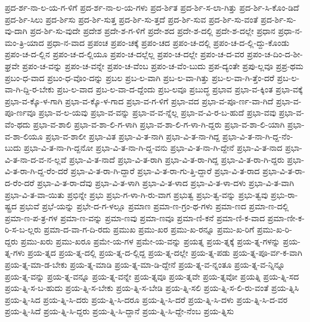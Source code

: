{ಪ್ರದ-ರ್ಶ-ನಾ-ಲ-ಯ-ಗ-ಳಿಗೆ
ಪ್ರದ-ರ್ಶ-ನಾ-ಲ-ಯ-ಗಳು
ಪ್ರದ-ರ್ಶಿತ
ಪ್ರದ-ರ್ಶಿ-ಸ-ಲಾ-ಗಿತ್ತು
ಪ್ರದ-ರ್ಶಿ-ಸಿ-ಕೊಂ-ಡಿದೆ
ಪ್ರದ-ರ್ಶಿ-ಸಿಲು
ಪ್ರದ-ರ್ಶಿಸು
ಪ್ರದ-ರ್ಶಿ-ಸುತ್ತ
ಪ್ರದ-ರ್ಶಿ-ಸು-ತ್ತದೆ
ಪ್ರದ-ರ್ಶಿ-ಸುವ
ಪ್ರದ-ರ್ಶಿ-ಸು-ವಂತೆ
ಪ್ರದ-ರ್ಶಿ-ಸು-ವು-ದಾಗಿ
ಪ್ರದ-ರ್ಶಿ-ಸು-ವುದೇ
ಪ್ರದೇಶ
ಪ್ರದೇ-ಶ-ಗ-ಳಿಗೆ
ಪ್ರದೇ-ಶದ
ಪ್ರದೇ-ಶ-ದಲ್ಲಿ
ಪ್ರದೇ-ಶ-ದಲ್ಲೇ
ಪ್ರಧಾನ
ಪ್ರಧಾ-ನ-ಮಂ-ತ್ರಿ-ಯಾದ
ಪ್ರಧಾ-ನ-ವಾದ
ಪ್ರಪಂಚ
ಪ್ರಪಂ-ಚಕ್ಕೆ
ಪ್ರಪಂ-ಚದ
ಪ್ರಪಂ-ಚ-ದಲ್ಲಿ
ಪ್ರಪಂ-ಚ-ದ-ಲ್ಲಿ-ದ್ದು-ಕೊಂಡು
ಪ್ರಪಂ-ಚ-ದ-ಲ್ಲಿನ
ಪ್ರಪಂ-ಚ-ದ-ಲ್ಲಿಯೂ
ಪ್ರಪಂ-ಚ-ದಲ್ಲೆಲ್ಲ
ಪ್ರಪಂ-ಚ-ದಲ್ಲೇ
ಪ್ರಪಂ-ಚ-ದ-ವರ
ಪ್ರಪಂ-ಚ-ದಿಂ-ದ-ಶೀ-ಘ್ರವೇ
ಪ್ರಪಂ-ಚ-ವನ್ನು
ಪ್ರಪಂ-ಚ-ವನ್ನೇ
ಪ್ರಪಂ-ಚ-ವೆಂಬ
ಪ್ರಪಂ-ಚ-ವೆಂ-ಬುದು
ಪ್ರಪ-ದ್ಯಂತೇ
ಪ್ರಪು-ಲ್ಲವೂ
ಪ್ರಪ್ರ-ಥಮ
ಪ್ರಬಂ-ಧ-ವಾದ
ಪ್ರಬಂ-ಧ-ವೊಂ-ದನ್ನು
ಪ್ರಬಲ
ಪ್ರಬ-ಲ-ವಾಗಿ
ಪ್ರಬ-ಲ-ವಾ-ಗಿತ್ತು
ಪ್ರಬ-ಲ-ವಾ-ಗಿ-ತ್ತೆಂ-ದರೆ
ಪ್ರಬ-ಲ-ವಾ-ಗಿ-ದ್ದಿ-ರ-ಬೇಕು
ಪ್ರಬ-ಲ-ವಾದ
ಪ್ರಬ-ಲ-ವಾ-ದ-ದ್ದೆಂದು
ಪ್ರಬ-ಲವೂ
ಪ್ರಬುದ್ಧ
ಪ್ರಭಾವ
ಪ್ರಭಾ-ವ-ಕ್ಕಿಂತ
ಪ್ರಭಾ-ವಕ್ಕೆ
ಪ್ರಭಾ-ವ-ಕ್ಕೊ-ಳ-ಗಾಗಿ
ಪ್ರಭಾ-ವ-ಕ್ಕೊ-ಳ-ಗಾದ
ಪ್ರಭಾ-ವ-ಗ-ಳಿಗೆ
ಪ್ರಭಾ-ವದ
ಪ್ರಭಾ-ವ-ಪೂ-ರ್ಣ-ವಾ-ಗಿದೆ
ಪ್ರಭಾ-ವ-ಪೂ-ರ್ಣವೂ
ಪ್ರಭಾ-ವ-ಲ-ಯವು
ಪ್ರಭಾ-ವ-ವನ್ನು
ಪ್ರಭಾ-ವ-ವ-ನ್ನೆಲ್ಲ
ಪ್ರಭಾ-ವ-ವಿ-ರ-ಬ-ಹುದೆ
ಪ್ರಭಾ-ವವು
ಪ್ರಭಾ-ವ-ವೆಂ-ಥದು
ಪ್ರಭಾ-ವ-ಶಾಲಿ
ಪ್ರಭಾ-ವ-ಶಾ-ಲಿ-ಗ-ಳಾಗಿ
ಪ್ರಭಾ-ವ-ಶಾ-ಲಿ-ಗ-ಳಾ-ಗಿ-ದ್ದರು
ಪ್ರಭಾ-ವ-ಶಾ-ಲಿ-ಯಾಗಿ
ಪ್ರಭಾ-ವ-ಶಾ-ಲಿಯೂ
ಪ್ರಭಾ-ವ-ಶಾಲೀ
ಪ್ರಭಾ-ವಿತ
ಪ್ರಭಾ-ವಿ-ತ-ನಾಗಿ
ಪ್ರಭಾ-ವಿ-ತ-ನಾ-ಗಿದ್ದ
ಪ್ರಭಾ-ವಿ-ತ-ನಾ-ಗಿ-ದ್ದ-ನೆಂ-ಬುದು
ಪ್ರಭಾ-ವಿ-ತ-ನಾ-ಗಿ-ದ್ದನೋ
ಪ್ರಭಾ-ವಿ-ತ-ನಾ-ಗಿ-ದ್ದ-ವನು
ಪ್ರಭಾ-ವಿ-ತ-ನಾ-ಗಿ-ದ್ದೇನೆ
ಪ್ರಭಾ-ವಿ-ತ-ನಾದ
ಪ್ರಭಾ-ವಿ-ತ-ನಾ-ದ-ವ-ನ-ಲ್ಲವೆ
ಪ್ರಭಾ-ವಿ-ತ-ನಾದೆ
ಪ್ರಭಾ-ವಿ-ತ-ರಾಗಿ
ಪ್ರಭಾ-ವಿ-ತ-ರಾ-ಗಿದ್ದ
ಪ್ರಭಾ-ವಿ-ತ-ರಾ-ಗಿ-ದ್ದರು
ಪ್ರಭಾ-ವಿ-ತ-ರಾ-ಗಿ-ದ್ದ-ರೆಂ-ದರೆ
ಪ್ರಭಾ-ವಿ-ತ-ರಾ-ಗಿ-ದ್ದಾರೆ
ಪ್ರಭಾ-ವಿ-ತ-ರಾ-ಗು-ತ್ತಿ-ದ್ದಾರೆ
ಪ್ರಭಾ-ವಿ-ತ-ರಾದ
ಪ್ರಭಾ-ವಿ-ತ-ರಾ-ದ-ರೆಂ-ದರೆ
ಪ್ರಭಾ-ವಿ-ತ-ರಾ-ದೆವು
ಪ್ರಭಾ-ವಿ-ತ-ಳಾಗಿ
ಪ್ರಭಾ-ವಿ-ತ-ಳಾದ
ಪ್ರಭಾ-ವಿ-ತ-ಳಾ-ದಳು
ಪ್ರಭಾ-ವಿ-ತ-ವಾಗಿ
ಪ್ರಭಾ-ವಿ-ತ-ವಾ-ಯಿತು
ಪ್ರಭಿನ್ನೇ
ಪ್ರಭು
ಪ್ರಭು-ಗ-ಳಾ-ಗಿ-ರು-ವಾಗ
ಪ್ರಭುತ್ವ
ಪ್ರಭು-ತ್ವ-ವನ್ನು
ಪ್ರಭು-ತ್ವವು
ಪ್ರಭು-ರಾ-ಷ್ಟ್ರದ
ಪ್ರಭುವೆ
ಪ್ರಭೆ-ಯನ್ನು
ಪ್ರಭೇ-ದ-ಗ-ಳಲ್ಲೂ
ಪ್ರಮಾಣ
ಪ್ರಮಾ-ಣ-ಗ್ರಂ-ಥ-ಗಳು
ಪ್ರಮಾ-ಣದ
ಪ್ರಮಾ-ಣ-ದಲ್ಲಿ
ಪ್ರಮಾ-ಣ-ಪ-ತ್ರ-ಗಳ
ಪ್ರಮಾ-ಣ-ವನ್ನು
ಪ್ರಮಾ-ಣವು
ಪ್ರಮಾ-ಣವೂ
ಪ್ರಮಾ-ಣಿ-ಕನೆ
ಪ್ರಮಾ-ಣಿ-ಕ-ವಾದ
ಪ್ರಮಾ-ಣೀ-ಕ-ರಿ-ಸ-ಬ-ಲ್ಲರು
ಪ್ರಮಾ-ದ-ವಾ-ಗ-ದಿ-ರದು
ಪ್ರಮುಖ
ಪ್ರಮು-ಖರ
ಪ್ರಮು-ಖ-ರನ್ನೂ
ಪ್ರಮು-ಖ-ರಿಗೆ
ಪ್ರಮು-ಖ-ರಿ-ದ್ದರು
ಪ್ರಮು-ಖರು
ಪ್ರಮು-ಖರೂ
ಪ್ರಮೇ-ಯ-ಗಳ
ಪ್ರಮೇ-ಯ-ವನ್ನು
ಪ್ರಯತ್ನ
ಪ್ರಯ-ತ್ನಕ್ಕೆ
ಪ್ರಯ-ತ್ನ-ಗಳನ್ನು
ಪ್ರಯ-ತ್ನ-ಗಳು
ಪ್ರಯ-ತ್ನದ
ಪ್ರಯ-ತ್ನ-ದಲ್ಲಿ
ಪ್ರಯ-ತ್ನ-ದ-ಲ್ಲಿದ್ದ
ಪ್ರಯ-ತ್ನ-ದಲ್ಲೇ
ಪ್ರಯ-ತ್ನ-ಪಡು
ಪ್ರಯ-ತ್ನ-ಪೂ-ರ್ವ-ಕ-ವಾಗಿ
ಪ್ರಯ-ತ್ನ-ಮಾ-ಡ-ಬೇಕು
ಪ್ರಯ-ತ್ನ-ಮಾಡಿ
ಪ್ರಯ-ತ್ನ-ಮಾ-ಡಿ-ದ್ದೇನೆ
ಪ್ರಯ-ತ್ನ-ವ-ನ್ನಂತೂ
ಪ್ರಯ-ತ್ನ-ವ-ನ್ನಿನ್ನೂ
ಪ್ರಯ-ತ್ನ-ವನ್ನು
ಪ್ರಯ-ತ್ನ-ವನ್ನೂ
ಪ್ರಯ-ತ್ನ-ವನ್ನೇ
ಪ್ರಯ-ತ್ನವೂ
ಪ್ರಯ-ತ್ನವೇ
ಪ್ರಯ-ತ್ನವೋ
ಪ್ರಯತ್ನಿ
ಪ್ರಯ-ತ್ನಿ-ಸದ
ಪ್ರಯ-ತ್ನಿ-ಸ-ಬ-ಹುದು
ಪ್ರಯ-ತ್ನಿ-ಸ-ಬೇಕು
ಪ್ರಯ-ತ್ನಿ-ಸ-ಬೇಡಿ
ಪ್ರಯ-ತ್ನಿ-ಸಲಿ
ಪ್ರಯ-ತ್ನಿ-ಸ-ಲಿ-ರು-ವಂತೆ
ಪ್ರಯ-ತ್ನಿಸಿ
ಪ್ರಯ-ತ್ನಿ-ಸಿದ
ಪ್ರಯ-ತ್ನಿ-ಸಿ-ದರು
ಪ್ರಯ-ತ್ನಿ-ಸಿ-ದರೂ
ಪ್ರಯ-ತ್ನಿ-ಸಿ-ದರೆ
ಪ್ರಯ-ತ್ನಿ-ಸಿ-ದಳು
ಪ್ರಯ-ತ್ನಿ-ಸಿ-ದ-ವರ
ಪ್ರಯ-ತ್ನಿ-ಸಿದೆ
ಪ್ರಯ-ತ್ನಿ-ಸಿ-ದ್ದರು
ಪ್ರಯ-ತ್ನಿ-ಸಿ-ದ್ದಾನೆ
ಪ್ರಯ-ತ್ನಿ-ಸಿ-ದ್ದೇ-ನೆಂಬ
ಪ್ರಯ-ತ್ನಿಸು
}
